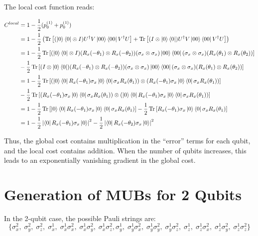 \documentclass[a4paper,12pt]{article}
\DeclareMathOperator{\tr}{Tr}
\begin{document}
The local cost function reads:

\begin{align*}
    C^{local} &= 1 - \frac{1}{2}(p_0^{(1)} + p_0^{(1)}) \\
    &= 1-\frac{1}{2}\left( \tr\left[ (\ket{0}\bra{0} \otimes I) U^\dagger V \ket{00}\bra{00} V^\dagger U \right] + \tr\left[ (I \otimes \ket{0}\bra{0}) U^\dagger V \ket{00}\bra{00} V^\dagger U  \right] \right) \\
    &= 1 - \frac{1}{2}\tr \left[ (\ket{0}\bra{0} \otimes I) (R_x(-\theta_1) \otimes R_x(-\theta_2)) (\sigma_x \otimes \sigma_x) \ket{00} \bra{00} (\sigma_x \otimes \sigma_x) (R_x(\theta_1) \otimes R_x(\theta_2)) \right] \\
    &- \frac{1}{2}\tr \left[ (I \otimes \ket{0}\bra{0}) (R_x(-\theta_1) \otimes R_x(-\theta_2)) (\sigma_x \otimes \sigma_x) \ket{00} \bra{00} (\sigma_x \otimes \sigma_x) (R_x(\theta_1) \otimes R_x(\theta_2)) \right] \\
    &= 1 - \frac{1}{2}\tr \left[ \left(\ket{0}\bra{0} R_x(-\theta_1) \sigma_x \ket{0} \bra{0} \sigma_x R_x(\theta_1) \right) \otimes \left( R_x(-\theta_1) \sigma_x \ket{0} \bra{0} \sigma_x R_x(\theta_1)\right) \right] \\
    &- \frac{1}{2}\tr \left[ \left(R_x(-\theta_1) \sigma_x \ket{0} \bra{0} \sigma_x R_x(\theta_1) \right) \otimes \left(\ket{0}\bra{0} R_x(-\theta_1) \sigma_x \ket{0} \bra{0} \sigma_x R_x(\theta_1)\right) \right] \\
    &= 1 - \frac{1}{2}\tr \left[\ket{0}\bra{0} R_x(-\theta_1) \sigma_x \ket{0} \bra{0} \sigma_x R_x(\theta_1) \right] - \frac{1}{2}\tr \left[ R_x(-\theta_1) \sigma_x \ket{0} \bra{0} \sigma_x R_x(\theta_1) \right] \\
    &= 1 - \frac{1}{2} \left| \bra{0} R_x(-\theta_1) \sigma_x \ket{0} \right|^2 - \frac{1}{2} \left| \bra{0} R_x(-\theta_2) \sigma_x \ket{0} \right|^2
\end{align*}


Thus, the global cost contains multiplication in the ``error'' terms for each qubit, and the local cost contains addition.
When the number of qubits increases, this leads to an exponentially vanishing gradient in the global cost.


\section{Generation of MUBs for 2 Qubits} \label{app:mub_table}
In the 2-qubit case, the possible Pauli strings are:
\begin{equation}
    \bigl\{  \sigma_x^2,\; \sigma_y^2,\; \sigma_z^2,\;
    \sigma_x^1,\; \sigma_x^1\sigma_x^2,\; \sigma_x^1\sigma_y^2,\; \sigma_x^1\sigma_z^2,
    \sigma_y^1,\; \sigma_y^1\sigma_x^2,\; \sigma_y^1\sigma_y^2,\; \sigma_y^1\sigma_z^2,\; 
    \sigma_z^1,\; \sigma_z^1\sigma_x^2,\; \sigma_z^1\sigma_y^2,\; \sigma_z^1\sigma_z^2 \bigr\}
\end{equation}
\end{document}
